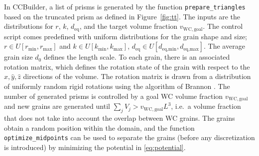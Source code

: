 \documentclass[3p,12pt]{elsarticle}
\newcommand{\WC}{\mathrm{WC}}
\begin{document}

In CCBuilder, a list of prisms is generated by the function \verb|prepare_triangles| based on the truncated prism as defined in Figure~\ref{fig:tt}.
The inputs are the distributions for $r$, $k$, $d_\text{eq}$, and the target volume fraction $v_{\WC,\text{goal}}$.
The control script comes predefined with uniform distributions for the grain shape and size; $r \in U[r_\text{min},r_\text{max}]$ and $k \in U[k_\text{min},k_\text{max}]$, $d_\text{eq} \in U[d_\text{eq,min},d_\text{eq,max}]$.
The average grain size $d_0$ defines the length scale.
%
To each grain, there is an associated rotation matrix, which defines the rotation state of the grain with respect to the $\hat{x}, \hat{y}, \hat{z}$ directions of the volume.
The rotation matrix is drawn from a distribution of uniformly random rigid rotations using the algorithm of Brannon \cite{brannon_rotation:_2002}.
The number of generated prisms is controlled by a goal WC volume fraction $v_{\WC,\text{goal}}$ and new grains are generated until $\sum_j V_j > v_{\WC,\text{goal}}L^3$, i.e.\ a volume fraction that does not take into account the overlap between WC grains.
The grains obtain a random position within the domain, and the function \verb+optimize_midpoints+ can be used to separate the grains (before any discretization is introduced) by minimizing the potential in \eqref{eq:potential}.
\end{document}

